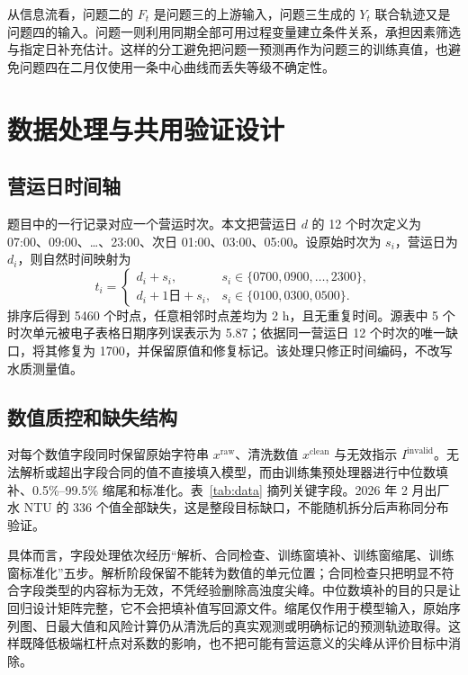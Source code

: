 \documentclass[UTF8,12pt,a4paper]{ctexart}
\begin{document}
从信息流看，问题二的 $F_t$ 是问题三的上游输入，问题三生成的 $Y_t$ 联合轨迹又是问题四的输入。问题一则利用同期全部可用过程变量建立条件关系，承担因素筛选与指定日补充估计。这样的分工避免把问题一预测再作为问题三的训练真值，也避免问题四在二月仅使用一条中心曲线而丢失等级不确定性。

\section{数据处理与共用验证设计}

\subsection{营运日时间轴}

题目中的一行记录对应一个营运时次。本文把营运日 $d$ 的 12 个时次定义为 07:00、09:00、\ldots、23:00、次日 01:00、03:00、05:00。设原始时次为 $s_i$，营运日为 $d_i$，则自然时间映射为
\begin{equation}
t_i=\begin{cases}
d_i+s_i, & s_i\in\{0700,0900,\ldots,2300\},\\
d_i+1\text{日}+s_i, & s_i\in\{0100,0300,0500\}.
\end{cases}
\label{eq:timeline}
\end{equation}
排序后得到 5460 个时点，任意相邻时点差均为 2 h，且无重复时间。源表中 5 个时次单元被电子表格日期序列误表示为 5.87；依据同一营运日 12 个时次的唯一缺口，将其修复为 1700，并保留原值和修复标记。该处理只修正时间编码，不改写水质测量值。

\subsection{数值质控和缺失结构}

对每个数值字段同时保留原始字符串 $x^{\mathrm{raw}}$、清洗数值 $x^{\mathrm{clean}}$ 与无效指示 $I^{\mathrm{invalid}}$。无法解析或超出字段合同的值不直接填入模型，而由训练集预处理器进行中位数填补、0.5\%--99.5\% 缩尾和标准化。表~\ref{tab:data} 摘列关键字段。2026 年 2 月出厂水 NTU 的 336 个值全部缺失，这是整段目标缺口，不能随机拆分后声称同分布验证。

具体而言，字段处理依次经历“解析、合同检查、训练窗填补、训练窗缩尾、训练窗标准化”五步。解析阶段保留不能转为数值的单元位置；合同检查只把明显不符合字段类型的内容标为无效，不凭经验删除高浊度尖峰。中位数填补的目的只是让回归设计矩阵完整，它不会把填补值写回源文件。缩尾仅作用于模型输入，原始序列图、日最大值和风险计算仍从清洗后的真实观测或明确标记的预测轨迹取得。这样既降低极端杠杆点对系数的影响，也不把可能有营运意义的尖峰从评价目标中消除。
\end{document}

